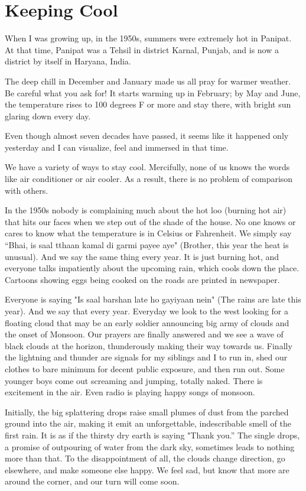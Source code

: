 \chapter{Keeping Cool}
When I was growing up, in the 1950s, summers were extremely hot in
Panipat. At that time, Panipat was a Tehsil in district Karnal, Punjab,
and is now a district by itself in Haryana, India. 

The deep chill in December and January made us all pray for warmer
weather. Be careful what you ask for! It starts warming up in February; by
May and June, the temperature rises to 100 degrees F or more and stay
there, with bright sun glaring down every day. 

Even though almost seven decades have passed, it seems like it happened
only yesterday and I can visualize, feel and immersed in that time. 
 
We have a variety of ways to stay cool. Mercifully, none of us knows the
words like air conditioner or air cooler. As a result, there is no problem
of comparison with others. 

In the 1950s nobody is complaining much about the hot loo (burning hot
air) that hits our faces when we step out of the shade of the house. No
one knows or cares to know what the temperature is in Celsius or
Fahrenheit. We simply say “Bhai, is saal tthaan kamal di garmi payee aye"
(Brother, this year the heat is unusual). And we say the same thing every
year. It is just burning hot, and everyone talks impatiently about the
upcoming rain, which cools down the place. Cartoons showing eggs being
cooked on the roads are printed in newspaper. 
 
Everyone is saying "Is saal barshan late ho gayiyaan nein" (The rains are
late this year). And we say that every year. Everyday we look to the west
looking for a floating cloud that may be an early soldier announcing big
army of clouds and the onset of Monsoon. Our prayers are finally answered
and we see a wave of black clouds at the horizon, thunderously making
their way towards us. Finally the lightning and thunder are signals for my
siblings and I to run in, shed our clothes to bare minimum for decent
public exposure, and then run out. Some younger boys come out screaming
and jumping, totally naked. There is excitement in the air. Even radio is
playing happy songs of monsoon. 
 
Initially, the big splattering drops raise small plumes of dust from the
parched ground into the air, making it emit an unforgettable,
indescribable smell of the first rain. It is as if the thirsty dry earth
is saying "Thank you.” The single drops, a promise of outpouring of water
from the dark sky, sometimes leads to nothing more than that. To the
disappointment of all, the clouds change direction, go elsewhere, and make
someone else happy. We feel sad, but know that more are around the corner,
and our turn will come soon. 

